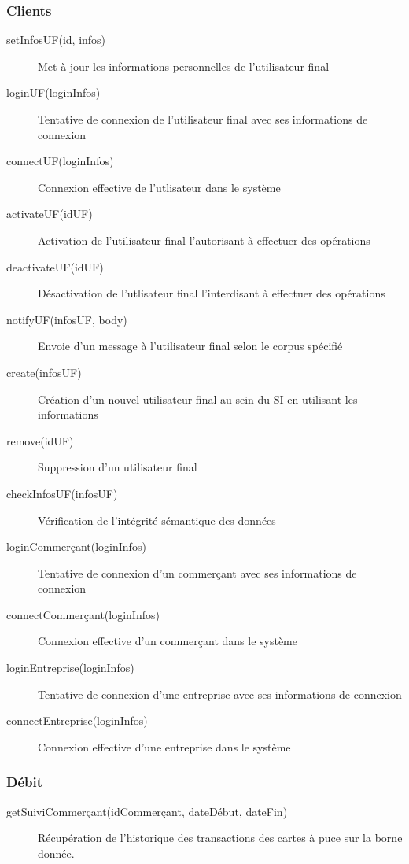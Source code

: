 \subsubsection{Clients}
\begin{description}
  \item[setInfosUF(id, infos)] Met à jour les informations personnelles de l'utilisateur final
  \item[loginUF(loginInfos)] Tentative de connexion de l'utilisateur final avec ses informations de connexion
  \item[connectUF(loginInfos)] Connexion effective de l'utlisateur dans le système
  \item[activateUF(idUF)] Activation de l'utilisateur final l'autorisant à effectuer des opérations
  \item[deactivateUF(idUF)] Désactivation de l'utlisateur final l'interdisant à effectuer des opérations
  \item[notifyUF(infosUF, body)] Envoie d'un message à l'utilisateur final selon le corpus spécifié
  \item[create(infosUF)] Création d'un nouvel utilisateur final au sein du SI en utilisant les informations
  \item[remove(idUF)] Suppression d'un utilisateur final
  \item[checkInfosUF(infosUF)] Vérification de l'intégrité sémantique des données
  \item[loginCommerçant(loginInfos)] Tentative de connexion d'un commerçant avec ses informations de connexion
  \item[connectCommerçant(loginInfos)] Connexion effective d'un commerçant dans le système
  \item[loginEntreprise(loginInfos)] Tentative de connexion d'une entreprise avec ses informations de connexion
  \item[connectEntreprise(loginInfos)] Connexion effective d'une entreprise dans le système
\end{description}

\subsubsection{Débit}

\begin{description}
  \item[getSuiviCommerçant(idCommerçant, dateDébut, dateFin)] Récupération de
    l'historique des transactions des cartes à puce sur la borne donnée.
\end{description}

